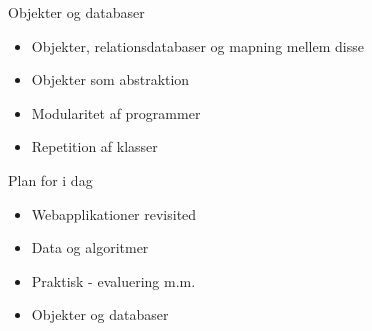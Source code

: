 \documentclass[a4paper,landscape]{slides}
\begin{document}
\begin{slide}
	\begin{center} {\large 
            Objekter og databaser 
	} \end{center}
	\begin{itemize} \addtolength{\itemsep}{-\baselineskip}
            \item Objekter, relationsdatabaser og mapning mellem disse

            \item Objekter som abstraktion 
            \item Modularitet af programmer 
            \item Repetition af klasser 
	\end{itemize}
\end{slide}

\begin{slide}
	\begin{center} {\large 
            Plan for i dag
	} \end{center}
	\begin{itemize} \addtolength{\itemsep}{-\baselineskip}
            \item Webapplikationer revisited
            \item Data og algoritmer
            \item Praktisk - evaluering m.m.
            \item Objekter og databaser
	\end{itemize}
\end{slide}
\end{document}
